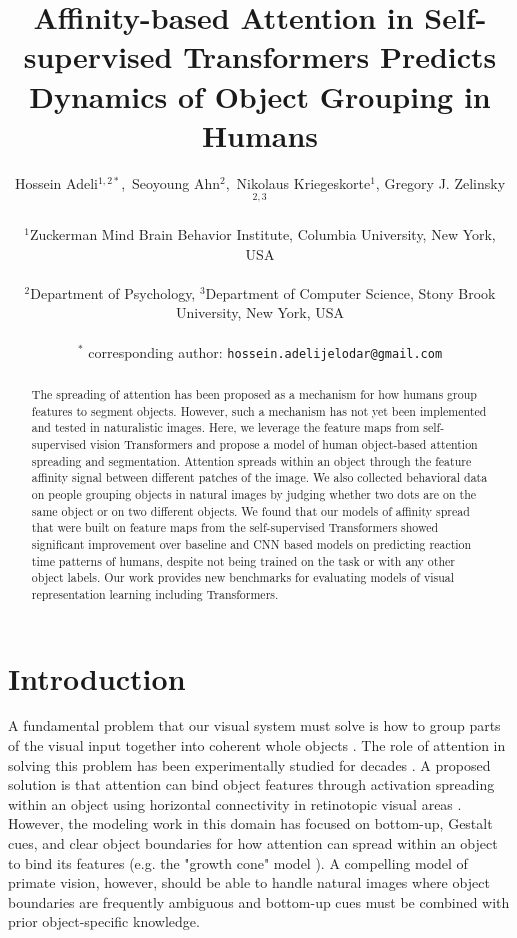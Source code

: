 \documentclass{article}
\title{Affinity-based Attention in Self-supervised Transformers Predicts Dynamics of Object Grouping in Humans}
\author{
  Hossein Adeli$^{1,2*}$,\, Seoyoung Ahn$^{2}$,\, Nikolaus Kriegeskorte$^{1}$, Gregory J. Zelinsky$^{2,3}$\\ \\
  $^{1}$Zuckerman Mind Brain Behavior Institute, Columbia University, New York, USA \\ \\
  $^{2}$Department of Psychology, $^{3}$Department of Computer Science, 
  Stony Brook University, New York, USA \\ \\
    $^{*}$ corresponding author: \texttt{hossein.adelijelodar@gmail.com}\\
  }
\begin{document}
\maketitle

\begin{abstract}
  The spreading of attention has been proposed as a mechanism for how humans group features to segment objects. However, such a mechanism has not yet been implemented and tested in naturalistic images. Here, we leverage the feature maps from self-supervised vision Transformers and propose a model of human object-based attention spreading and segmentation. Attention spreads within an object through the feature affinity signal between different patches of the image. We also collected behavioral data on people grouping objects in natural images by judging whether two dots are on the same object or on two different objects. We found that our models of affinity spread that were built on feature maps from the self-supervised Transformers showed significant improvement over baseline and CNN based models on predicting reaction time patterns of humans, despite not being trained on the task or with any other object labels. Our work provides new benchmarks for evaluating models of visual representation learning including Transformers. 
\end{abstract}


\section{Introduction}

A fundamental problem that our visual system must solve is how to group parts of the visual input together into coherent whole objects \citep{peters2021capturing}. The role of attention in solving this problem has been experimentally studied for decades \citep{treisman1996binding, adeli2022brain}. A proposed solution is that attention can bind object features through activation spreading within an object using horizontal connectivity in retinotopic visual areas \citep{roelfsema2023solving}. However, the modeling work in this domain has focused on bottom-up, Gestalt cues, and clear object boundaries for how attention can spread within an object to bind its features (e.g. the "growth cone" model \citep{jeurissen2016serial}). A compelling model of primate vision, however, should be able to handle natural images where object boundaries are frequently ambiguous and bottom-up cues must be combined with prior object-specific knowledge. 
\end{document}
